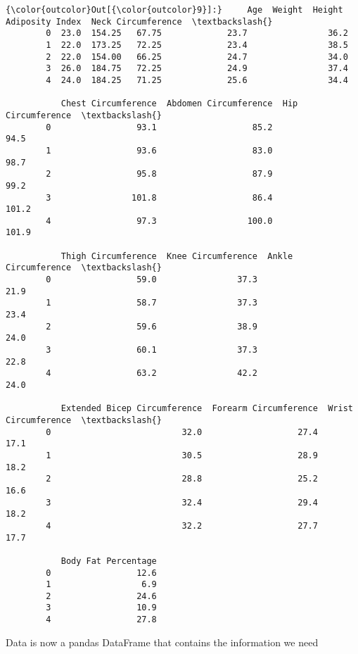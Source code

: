 \documentclass[11pt]{article}
\begin{document}
\begin{Verbatim}[commandchars=\\\{\}]
{\color{outcolor}Out[{\color{outcolor}9}]:}     Age  Weight  Height  Adiposity Index  Neck Circumference  \textbackslash{}
        0  23.0  154.25   67.75             23.7                36.2   
        1  22.0  173.25   72.25             23.4                38.5   
        2  22.0  154.00   66.25             24.7                34.0   
        3  26.0  184.75   72.25             24.9                37.4   
        4  24.0  184.25   71.25             25.6                34.4   
        
           Chest Circumference  Abdomen Circumference  Hip Circumference  \textbackslash{}
        0                 93.1                   85.2               94.5   
        1                 93.6                   83.0               98.7   
        2                 95.8                   87.9               99.2   
        3                101.8                   86.4              101.2   
        4                 97.3                  100.0              101.9   
        
           Thigh Circumference  Knee Circumference  Ankle Circumference  \textbackslash{}
        0                 59.0                37.3                 21.9   
        1                 58.7                37.3                 23.4   
        2                 59.6                38.9                 24.0   
        3                 60.1                37.3                 22.8   
        4                 63.2                42.2                 24.0   
        
           Extended Bicep Circumference  Forearm Circumference  Wrist Circumference  \textbackslash{}
        0                          32.0                   27.4                 17.1   
        1                          30.5                   28.9                 18.2   
        2                          28.8                   25.2                 16.6   
        3                          32.4                   29.4                 18.2   
        4                          32.2                   27.7                 17.7   
        
           Body Fat Percentage  
        0                 12.6  
        1                  6.9  
        2                 24.6  
        3                 10.9  
        4                 27.8  
\end{Verbatim}
            
    Data is now a pandas DataFrame that contains the information we need
\end{document}
